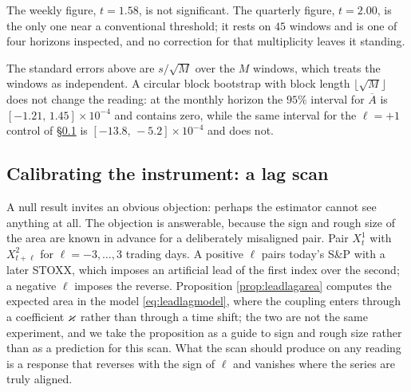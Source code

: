 The weekly figure, $t=1.58$, is not significant. The quarterly figure, $t=2.00$, is the only one near
a conventional threshold; it rests on $45$ windows and is one of four horizons inspected, and no
correction for that multiplicity leaves it standing.

The standard errors above are $s/\sqrt{M}$ over the $M$ windows, which treats the windows as
independent. A circular block bootstrap with block length $\lfloor\sqrt{M}\rfloor$ does not change
the reading: at the monthly horizon the $95\%$ interval for $\overline{A}$ is
$[-1.21,\,1.45]\times10^{-4}$ and contains zero, while the same interval for the $\ell=+1$ control of
\S\ref{subsec:levylag} is $[-13.8,\,-5.2]\times10^{-4}$ and does not.



\subsection{Calibrating the instrument: a lag scan}
\label{subsec:levylag}

A null result invites an obvious objection: perhaps the estimator cannot see anything at all. The
objection is answerable, because the sign and rough size of the area are known in advance for a
deliberately misaligned pair. Pair $X^{1}_{t}$ with $X^{2}_{t+\ell}$ for $\ell=-3,\dots,3$ trading
days. A positive $\ell$ pairs today's S\&P with a later STOXX, which imposes an artificial lead of
the first index over the second; a negative $\ell$ imposes the reverse. Proposition
\ref{prop:leadlagarea} computes the expected area in the model \eqref{eq:leadlagmodel}, where the
coupling enters through a coefficient $\varkappa$ rather than through a time shift; the two are not the
same experiment, and we take the proposition as a guide to sign and rough size rather than as a
prediction for this scan. What the scan should produce on any reading is a response that reverses
with the sign of $\ell$ and vanishes where the series are truly aligned.

